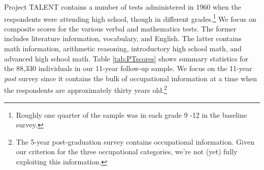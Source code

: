 \documentclass[onehalfspacing,11pt]{article}
\begin{document}
	Project TALENT contains a number of tests administered in 1960 when the respondents were attending high school, though in different grades.\footnote{Roughly one quarter of the sample was in each grade 9 -12 in the baseline survey.} We focus on composite scores for the various verbal and mathematics tests. The former includes literature information, vocabulary, and English. The latter contains math information, arithmetic reasoning, introductory high school math, and advanced high school math. Table \ref{tab:PTscores} shows summary statistics for the 88,330 individuals in our 11-year follow-up sample. We focus on the 11-year {\it post} survey since it contains the bulk of occupational information at a time when the respondents are approximately thirty years old.\footnote{The 5-year post-graduation survey contains occupational information. Given our criterion for the three occupational categories, we're not (yet) fully exploiting this information.}
	
\end{document}
